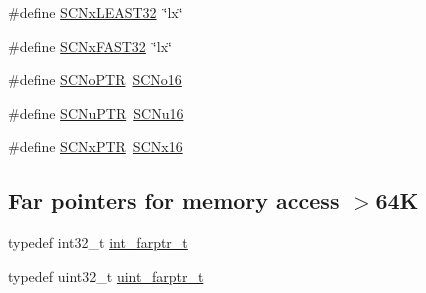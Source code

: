 \begin{DoxyCompactItemize}
\item 
\#define \hyperlink{group__avr__inttypes_gabd82b99090a28a84541959ac7ab14ad9}{S\+C\+Nx\+L\+E\+A\+S\+T32}~\char`\"{}lx\char`\"{}
\item 
\#define \hyperlink{group__avr__inttypes_gac45f394be3c199938a85a631711ce22e}{S\+C\+Nx\+F\+A\+S\+T32}~\char`\"{}lx\char`\"{}
\item 
\#define \hyperlink{group__avr__inttypes_ga4a30d36e06018d8e13046079098905a0}{S\+C\+No\+P\+TR}~\hyperlink{group__avr__inttypes_ga9bc6b517c0117327e832824ff2d6a6b5}{S\+C\+No16}
\item 
\#define \hyperlink{group__avr__inttypes_gab7dbf5d0ea41679dface5855896e4273}{S\+C\+Nu\+P\+TR}~\hyperlink{group__avr__inttypes_ga37bbde0e3f124b7f482d54adb13b0248}{S\+C\+Nu16}
\item 
\#define \hyperlink{group__avr__inttypes_gaa58d290d968643862aec7a8a56e1c8e9}{S\+C\+Nx\+P\+TR}~\hyperlink{group__avr__inttypes_ga12dbc2ac6a36b893ef1c25c357f90a9f}{S\+C\+Nx16}
\end{DoxyCompactItemize}
\subsection*{Far pointers for memory access $>$64K}
\begin{DoxyCompactItemize}
\item 
typedef int32\+\_\+t \hyperlink{group__avr__inttypes_ga5082b177b7d7b2039652c26a72b96d18}{int\+\_\+farptr\+\_\+t}
\item 
typedef uint32\+\_\+t \hyperlink{group__avr__inttypes_ga72b6692e3f3123903c1a0d9a960c59b1}{uint\+\_\+farptr\+\_\+t}
\end{DoxyCompactItemize}

